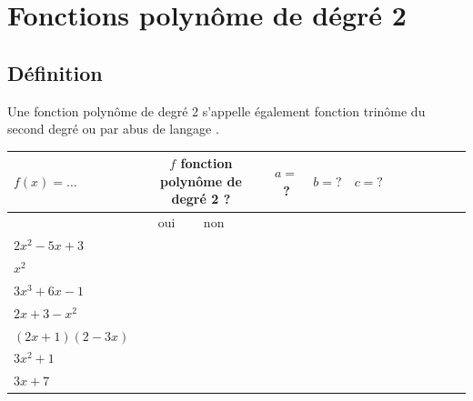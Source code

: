 
\chapter{Fonctions polynôme de dégré 2}
\thispagestyle{fancy}

\vspace*{-0.5cm}
\section{Définition}

	\vspace*{-0.2cm}
    \begin{bdefi}
        \pointille[\textwidth]
        
        \pointille[\textwidth]
        
        \pointille[\textwidth]
    \end{bdefi}
    
    \begin{brmq}
        Une fonction polynôme de degré 2 s'appelle également fonction trinôme du second degré ou par abus de langage .
    \end{brmq}
    
    \begin{bexemples}
    	
    	\setlength{\extrarowheight}{2pt}
        \begin{tabular}[t]{|Xc|Xc|Xc|Xc|Xc|Xc|}
        	\hline \multirow[b]{2}{*}{$f(x)=\ldots$} & \multicolumn{2}{|c|}{$f$ fonction polynôme de degré 2 ?} & $a=$ ? & $b=?$ & $c=?$ \\
        	\hline & oui & non & & & \\
        	\hline $2 x^2-5 x+3$ & & & & & \\
        	\hline $x^2$ & & & & & \\
        	\hline $3 x^3+6 x-1$ & & & & & \\
        	\hline $2 x+3-x^2$ & & & & & \\
        	\hline $(2 x+1)(2-3 x)$ & & & & & \\
        	\hline $3 x^2+1$ & & & & & \\
        	\hline $3 x+7$ & & & & & \\
        	\hline
        \end{tabular}
    \end{bexemples}

